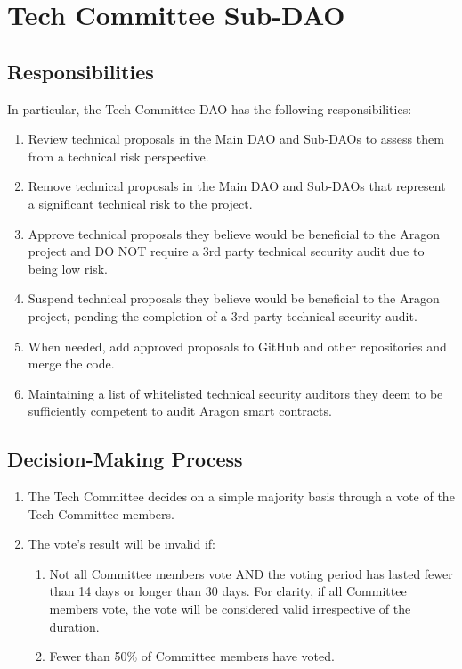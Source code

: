 \section{Tech Committee Sub-DAO}

\subsection{Responsibilities}		

In particular, the Tech Committee \ac{DAO} has the following responsibilities:
\begin{enumerate}		
	\item Review technical proposals in the Main \ac{DAO} and Sub-\acp{DAO} to assess them from a technical risk perspective.
	\item Remove technical proposals in the Main \ac{DAO} and Sub-\acp{DAO} that represent a significant technical risk to the project.
	\item Approve technical proposals they believe would be beneficial to the Aragon project and DO NOT require a 3rd party technical security audit due to being low risk.
	\item Suspend technical proposals they believe would be beneficial to the Aragon project, pending the completion of a 3rd party technical security audit.
	\item When needed, add approved proposals to GitHub and other repositories and merge the code.
	\item Maintaining a list of whitelisted technical security auditors they deem to be sufficiently competent to audit Aragon smart contracts.
\end{enumerate}



\subsection{Decision-Making Process}

\begin{enumerate}
	\item The Tech Committee decides on a simple majority basis through a vote of the Tech Committee members.
	\item The vote’s result will be invalid if:
	\begin{enumerate}
		\item Not all Committee members vote AND the voting period has lasted
		fewer than 14 days or longer than 30 days.
		For clarity, if all Committee members vote, the vote will be considered valid irrespective of the duration.
		\item Fewer than 50\% of Committee members have voted.
	\end{enumerate}
\end{enumerate}


